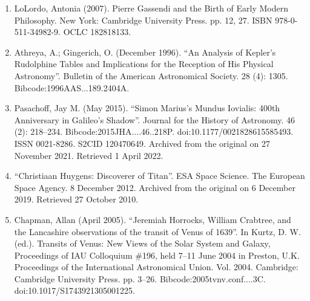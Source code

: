 \begin{enumerate}
\item LoLordo, Antonia (2007). Pierre Gassendi and the Birth of Early Modern Philosophy. New York: Cambridge University Press. pp. 12, 27. ISBN 978-0-511-34982-9. OCLC 182818133.
\item Athreya, A.; Gingerich, O. (December 1996). ``An Analysis of Kepler's Rudolphine Tables and Implications for the Reception of His Physical Astronomy''. Bulletin of the American Astronomical Society. 28 (4): 1305. Bibcode:1996AAS...189.2404A.
\item Pasachoff, Jay M. (May 2015). ``Simon Marius's Mundus Iovialis: 400th Anniversary in Galileo's Shadow''. Journal for the History of Astronomy. 46 (2): 218–234. Bibcode:2015JHA....46..218P. doi:10.1177/0021828615585493. ISSN 0021-8286. S2CID 120470649. Archived from the original on 27 November 2021. Retrieved 1 April 2022.
\item ``Christiaan Huygens: Discoverer of Titan''. ESA Space Science. The European Space Agency. 8 December 2012. Archived from the original on 6 December 2019. Retrieved 27 October 2010.
\item Chapman, Allan (April 2005). ``Jeremiah Horrocks, William Crabtree, and the Lancashire observations of the transit of Venus of 1639''. In Kurtz, D. W. (ed.). Transits of Venus: New Views of the Solar System and Galaxy, Proceedings of IAU Colloquium \#196, held 7–11 June 2004 in Preston, U.K. Proceedings of the International Astronomical Union. Vol. 2004. Cambridge: Cambridge University Press. pp. 3–26. Bibcode:2005tvnv.conf....3C. doi:10.1017/S1743921305001225.

\end{enumerate}
